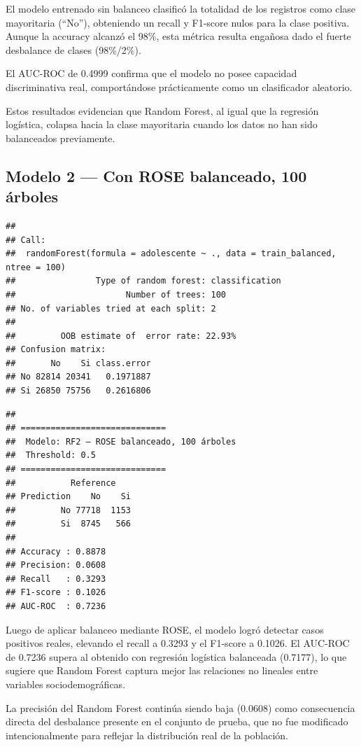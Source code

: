 \documentclass[
]{article}
\begin{document}
El modelo entrenado sin balanceo clasificó la totalidad de los registros
como clase mayoritaria (``No''), obteniendo un recall y F1-score nulos
para la clase positiva. Aunque la accuracy alcanzó el 98\%, esta métrica
resulta engañosa dado el fuerte desbalance de clases (98\%/2\%).

El AUC-ROC de 0.4999 confirma que el modelo no posee capacidad
discriminativa real, comportándose prácticamente como un clasificador
aleatorio.

Estos resultados evidencian que Random Forest, al igual que la regresión
logística, colapsa hacia la clase mayoritaria cuando los datos no han
sido balanceados previamente.

\subsection{Modelo 2 --- Con ROSE balanceado, 100
árboles}\label{modelo-2-con-rose-balanceado-100-uxe1rboles}

\begin{verbatim}
## 
## Call:
##  randomForest(formula = adolescente ~ ., data = train_balanced,      ntree = 100) 
##                Type of random forest: classification
##                      Number of trees: 100
## No. of variables tried at each split: 2
## 
##         OOB estimate of  error rate: 22.93%
## Confusion matrix:
##       No    Si class.error
## No 82814 20341   0.1971887
## Si 26850 75756   0.2616806
\end{verbatim}

\begin{verbatim}
## 
## =============================
##  Modelo: RF2 – ROSE balanceado, 100 árboles 
##  Threshold: 0.5 
## =============================
##           Reference
## Prediction    No    Si
##         No 77718  1153
##         Si  8745   566
## 
## Accuracy : 0.8878 
## Precision: 0.0608 
## Recall   : 0.3293 
## F1-score : 0.1026 
## AUC-ROC  : 0.7236
\end{verbatim}

Luego de aplicar balanceo mediante ROSE, el modelo logró detectar casos
positivos reales, elevando el recall a 0.3293 y el F1-score a 0.1026. El
AUC-ROC de 0.7236 supera al obtenido con regresión logística balanceada
(0.7177), lo que sugiere que Random Forest captura mejor las relaciones
no lineales entre variables sociodemográficas.

La precisión del Random Forest continúa siendo baja (0.0608) como
consecuencia directa del desbalance presente en el conjunto de prueba,
que no fue modificado intencionalmente para reflejar la distribución
real de la población.
\end{document}
